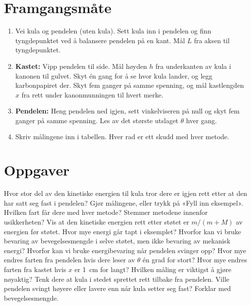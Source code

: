 \documentclass[11pt]{article}
\begin{document}
\section*{Framgangsmåte}

\begin{enumerate}
\item Vei kula og pendelen (uten kula). Sett kula inn i pendelen og finn tyngdepunktet ved å balansere pendelen på en kant. Mål $L$ fra aksen til tyngdepunktet.
\item \textbf{Kastet:} Vipp pendelen til side. Mål høyden $h$ fra underkanten av kula i kanonen til gulvet. Skyt én gang for å se hvor kula lander, og legg karbonpapiret der. Skyt fem ganger på samme spenning, og mål kastlengden $x$ fra rett under kanonmunningen til hvert merke.
\item \textbf{Pendelen:} Heng pendelen ned igjen, sett vinkelviseren på null og skyt fem ganger på samme spenning. Les av det største utslaget $θ$ hver gang.
\item Skriv målingene inn i tabellen. Hver rad er ett skudd med hver metode.
\end{enumerate}

\section*{Oppgaver}

\begin{oppgaveliste}
\oppgave {}Hvor stor del av den kinetiske energien til kula tror dere er igjen rett etter at den har satt seg fast i pendelen?
\svar
\oppgave {}Gjør målingene, eller trykk på «Fyll inn eksempel». Hvilken fart får dere med hver metode? Stemmer metodene innenfor usikkerheten?
\svar
\oppgave {}Vis at den kinetiske energien rett etter støtet er $m/(m + M)$ av energien før støtet. Hvor mye energi går tapt i eksemplet?
\svar
\oppgave {}Hvorfor kan vi bruke bevaring av bevegelsesmengde i selve støtet, men ikke bevaring av mekanisk energi? Hvorfor kan vi bruke energibevaring når pendelen svinger opp?
\svar
\oppgave {}Hvor mye endres farten fra pendelen hvis dere leser av $θ$ én grad for stort? Hvor mye endres farten fra kastet hvis $x$ er 1~cm for langt? Hvilken måling er viktigst å gjøre nøyaktig?
\svar
\oppgave {}Tenk dere at kula i stedet sprettet rett tilbake fra pendelen. Ville pendelen svingt høyere eller lavere enn når kula setter seg fast? Forklar med bevegelsesmengde.
\svar
\end{oppgaveliste}
\end{document}
